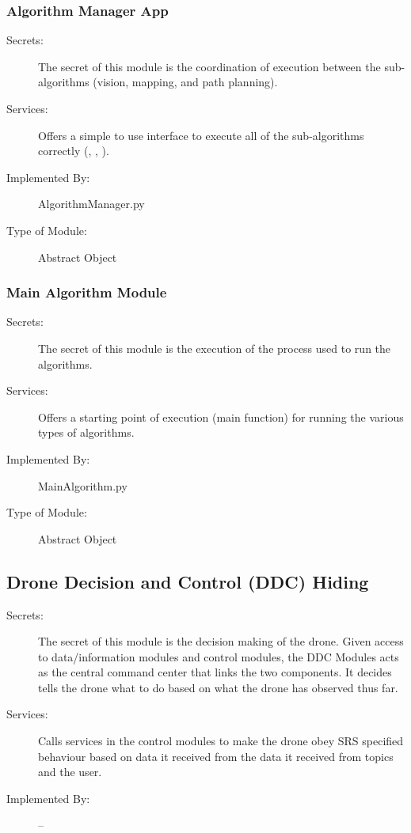 \documentclass[12pt, titlepage]{article}
\begin{document}
\subsubsection{Algorithm Manager App}
\label{Algorithm Manager App}
\begin{description}
\item[Secrets:] The secret of this module is the coordination of execution between the sub-algorithms (vision, mapping, and path planning). 
\item[Services:] Offers a simple to use interface to execute all of the sub-algorithms correctly (, , ).
\item[Implemented By:] AlgorithmManager.py
\item[Type of Module:] Abstract Object
\end{description}

\subsubsection{Main Algorithm Module}
\label{Main Algorithm Module}
\begin{description}
\item[Secrets:] The secret of this module is the execution of the process used to run the algorithms.
\item[Services:] Offers a starting point of execution (main function) for running the various types of algorithms.
\item[Implemented By:] MainAlgorithm.py
\item[Type of Module:] Abstract Object
\end{description}

\subsection{Drone Decision and Control (DDC) Hiding}
\label{Drone Decision and Control Modules}
\begin{description}
\item[Secrets:] The secret of this module is the decision making of the drone. Given access to  data/information modules and control modules, the DDC Modules acts as the central command center that links the two components. It decides tells the drone what to do based on what the drone has observed thus far.
\item[Services:] Calls services in the control modules to make the drone obey SRS specified behaviour based on data it received from the data it received from topics and the user.
\item[Implemented By:] --
\end{description}
\end{document}
